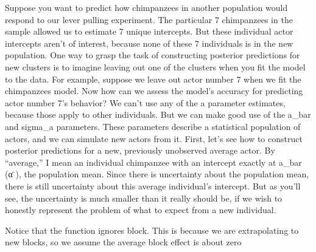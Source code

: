 \documentclass[
]{article}
\begin{document}
Suppose you want to predict how chimpanzees in another population would
respond to our lever pulling experiment. The particular 7 chimpanzees in
the sample allowed us to estimate 7 unique intercepts. But these
individual actor intercepts aren't of interest, because none of these 7
individuals is in the new population. One way to grasp the task of
constructing posterior predictions for new clusters is to imagine
leaving out one of the clusters when you fit the model to the data. For
example, suppose we leave out actor number 7 when we fit the chimpanzees
model. Now how can we assess the model's accuracy for predicting actor
number 7's behavior? We can't use any of the a parameter estimates,
because those apply to other individuals. But we can make good use of
the a\_bar and sigma\_a parameters. These parameters describe a
statistical population of actors, and we can simulate new actors from
it. First, let's see how to construct posterior predictions for a new,
previously unobserved average actor. By ``average,'' I mean an
individual chimpanzee with an intercept exactly at a\_bar (α ̄), the
population mean. Since there is uncertainty about the population mean,
there is still uncertainty about this average individual's intercept.
But as you'll see, the uncertainty is much smaller than it really should
be, if we wish to honestly represent the problem of what to expect from
a new individual.

Notice that the function ignores block. This is because we are
extrapolating to new blocks, so we assume the average block effect is
about zero
\end{document}
